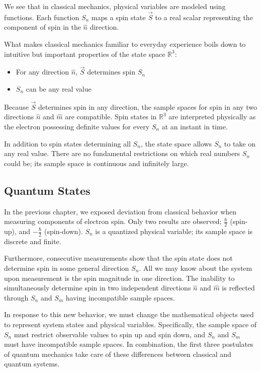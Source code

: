 We see that in classical mechanics, physical variables are modeled using functions. Each function $S_n$ maps a spin state $\vec{S}$ to a real scalar representing the component of spin in the $\hat{n}$ direction.

What makes classical mechanics familiar to everyday experience boils down to intuitive but important properties of the state space $\mathbb{R}^3$:
\begin{itemize}
\item For any direction $\hat{n}$, $\vec{S}$ determines spin $S_n$
\item $S_n$ can be any real value
\end{itemize}

Because $\vec{S}$ determines spin in any direction, the sample spaces for spin in any two directions $\hat{n}$ and $\hat{m}$ are compatible. Spin states in $\mathbb{R}^3$ are interpreted physically as the electron possessing definite values for every $S_n$ at an instant in time.

In addition to spin states determining all $S_n$, the state space allows $S_n$ to take on any real value. There are no fundamental restrictions on which real numbers $S_n$ could be; its sample space is continuous and infinitely large.

\subsection{Quantum States}
In the previous chapter, we exposed deviation from classical behavior when measuring components of electron spin. Only two results are observed; $\frac{\hbar}{2}$ (spin-up), and $-\frac{\hbar}{2}$ (spin-down). $S_n$ is a quantized physical variable; its sample space is discrete and finite.

Furthermore, consecutive measurements show that the spin state does not determine spin in some general direction $S_n$. All we may know about the system upon measurement is the spin magnitude in one direction. The inability to simultaneously determine spin in two independent directions $\hat{n}$ and $\hat{m}$ is reflected through $S_n$ and $S_m$ having incompatible sample spaces.

In response to this new behavior, we must change the mathematical objects used to represent system states and physical variables. Specifically, the sample space of $S_n$ must restrict observable values to spin up and spin down, and $S_n$ and $S_m$ must have incompatible sample spaces. In combination, the first three postulates of quantum mechanics take care of these differences between classical and quantum systems.

